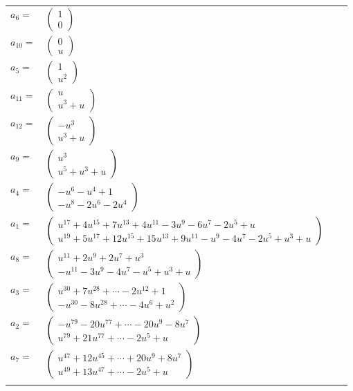 \documentclass[1p]{elsarticle_modified}
\theoremstyle{definition}
\begin{document}
\begin{tabular}{m{7pt} m{180pt} m{7pt} m{180pt} }
\flushright $a_{6}=$&$\begin{pmatrix}1\\0\end{pmatrix}$ \\
\flushright $a_{10}=$&$\begin{pmatrix}0\\u\end{pmatrix}$ \\
\flushright $a_{5}=$&$\begin{pmatrix}1\\u^2\end{pmatrix}$ \\
\flushright $a_{11}=$&$\begin{pmatrix}u\\u^3+u\end{pmatrix}$ \\
\flushright $a_{12}=$&$\begin{pmatrix}- u^3\\u^3+u\end{pmatrix}$ \\
\flushright $a_{9}=$&$\begin{pmatrix}u^3\\u^5+u^3+u\end{pmatrix}$ \\
\flushright $a_{4}=$&$\begin{pmatrix}- u^6- u^4+1\\- u^8-2 u^6-2 u^4\end{pmatrix}$ \\
\flushright $a_{1}=$&$\begin{pmatrix}u^{17}+4 u^{15}+7 u^{13}+4 u^{11}-3 u^9-6 u^7-2 u^5+u\\u^{19}+5 u^{17}+12 u^{15}+15 u^{13}+9 u^{11}- u^9-4 u^7-2 u^5+u^3+u\end{pmatrix}$ \\
\flushright $a_{8}=$&$\begin{pmatrix}u^{11}+2 u^9+2 u^7+u^3\\- u^{11}-3 u^9-4 u^7- u^5+u^3+u\end{pmatrix}$ \\
\flushright $a_{3}=$&$\begin{pmatrix}u^{30}+7 u^{28}+\cdots-2 u^{12}+1\\- u^{30}-8 u^{28}+\cdots-4 u^6+u^2\end{pmatrix}$ \\
\flushright $a_{2}=$&$\begin{pmatrix}- u^{79}-20 u^{77}+\cdots-20 u^9-8 u^7\\u^{79}+21 u^{77}+\cdots-2 u^5+u\end{pmatrix}$ \\
\flushright $a_{7}=$&$\begin{pmatrix}u^{47}+12 u^{45}+\cdots+20 u^9+8 u^7\\u^{49}+13 u^{47}+\cdots-2 u^5+u\end{pmatrix}$\\&\end{tabular}
\end{document}
